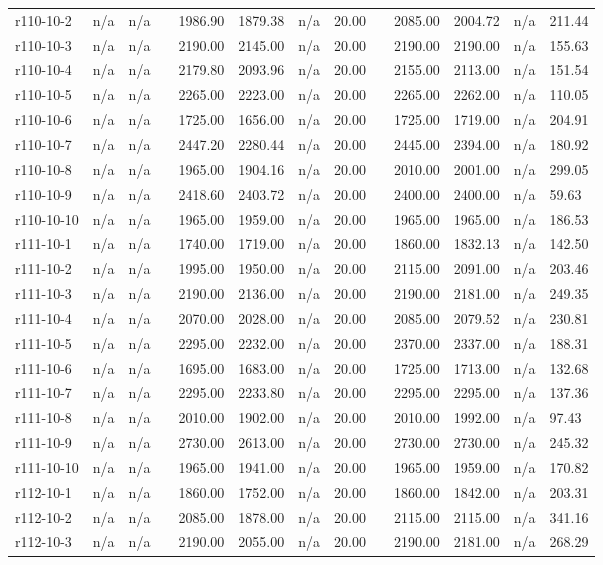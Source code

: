 \documentclass[final,5p,times,twocolumn]{elsarticle}
\begin{document}
{{{{{{{{{{{{{\begin{longtable}{l l l l l l l l l l l l l}
r110-10-2& n/a& n/a&&1986.90& 1879.38& n/a& 20.00&&2085.00& 2004.72& n/a& 211.44\\
r110-10-3& n/a& n/a&&2190.00& 2145.00& n/a& 20.00&&2190.00& 2190.00& n/a& 155.63\\
r110-10-4& n/a& n/a&&2179.80& 2093.96& n/a& 20.00&&2155.00& 2113.00& n/a& 151.54\\
r110-10-5& n/a& n/a&&2265.00& 2223.00& n/a& 20.00&&2265.00& 2262.00& n/a& 110.05\\
r110-10-6& n/a& n/a&&1725.00& 1656.00& n/a& 20.00&&1725.00& 1719.00& n/a& 204.91\\
r110-10-7& n/a& n/a&&2447.20& 2280.44& n/a& 20.00&&2445.00& 2394.00& n/a& 180.92\\
r110-10-8& n/a& n/a&&1965.00& 1904.16& n/a& 20.00&&2010.00& 2001.00& n/a& 299.05\\
r110-10-9& n/a& n/a&&2418.60& 2403.72& n/a& 20.00&&2400.00& 2400.00& n/a& 59.63\\
r110-10-10& n/a& n/a&&1965.00& 1959.00& n/a& 20.00&&1965.00& 1965.00& n/a& 186.53\\
r111-10-1& n/a& n/a&&1740.00& 1719.00& n/a& 20.00&&1860.00& 1832.13& n/a& 142.50\\
r111-10-2& n/a& n/a&&1995.00& 1950.00& n/a& 20.00&&2115.00& 2091.00& n/a& 203.46\\
r111-10-3& n/a& n/a&&2190.00& 2136.00& n/a& 20.00&&2190.00& 2181.00& n/a& 249.35\\
r111-10-4& n/a& n/a&&2070.00& 2028.00& n/a& 20.00&&2085.00& 2079.52& n/a& 230.81\\
r111-10-5& n/a& n/a&&2295.00& 2232.00& n/a& 20.00&&2370.00& 2337.00& n/a& 188.31\\
r111-10-6& n/a& n/a&&1695.00& 1683.00& n/a& 20.00&&1725.00& 1713.00& n/a& 132.68\\
r111-10-7& n/a& n/a&&2295.00& 2233.80& n/a& 20.00&&2295.00& 2295.00& n/a& 137.36\\
r111-10-8& n/a& n/a&&2010.00& 1902.00& n/a& 20.00&&2010.00& 1992.00& n/a& 97.43\\
r111-10-9& n/a& n/a&&2730.00& 2613.00& n/a& 20.00&&2730.00& 2730.00& n/a& 245.32\\
r111-10-10& n/a& n/a&&1965.00& 1941.00& n/a& 20.00&&1965.00& 1959.00& n/a& 170.82\\
r112-10-1& n/a& n/a&&1860.00& 1752.00& n/a& 20.00&&1860.00& 1842.00& n/a& 203.31\\
r112-10-2& n/a& n/a&&2085.00& 1878.00& n/a& 20.00&&2115.00& 2115.00& n/a& 341.16\\
r112-10-3& n/a& n/a&&2190.00& 2055.00& n/a& 20.00&&2190.00& 2181.00& n/a& 268.29\\

\end{longtable}}}}}}}}}}}}}}
\end{document}
